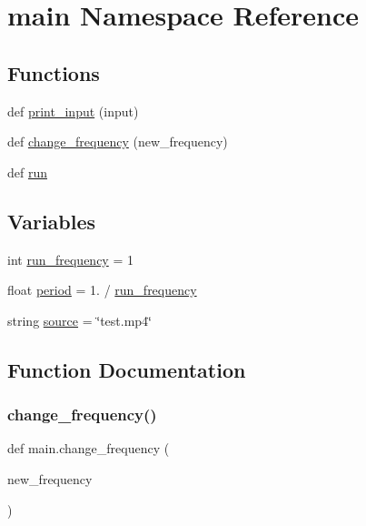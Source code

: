 \hypertarget{namespacemain}{}\section{main Namespace Reference}
\label{namespacemain}
\subsection*{Functions}
\begin{DoxyCompactItemize}
\item 
def \hyperlink{namespacemain_a0fe3fdb168f80f23bd787b6a6645d063}{print\+\_\+input} (input)
\item 
def \hyperlink{namespacemain_a191dcce5a995145c51a8935645d7de97}{change\+\_\+frequency} (new\+\_\+frequency)
\item 
def \hyperlink{namespacemain_a1fa92828a6a055fa38390012ffdd2b87}{run}
\end{DoxyCompactItemize}
\subsection*{Variables}
\begin{DoxyCompactItemize}
\item 
int \hyperlink{namespacemain_a57172d55d7c1b86fc48bcbc6c3783efb}{run\+\_\+frequency} = 1
\item 
float \hyperlink{namespacemain_a9ec7279618de6ff9195552f460584339}{period} = 1. / \hyperlink{namespacemain_a57172d55d7c1b86fc48bcbc6c3783efb}{run\+\_\+frequency}
\item 
string \hyperlink{namespacemain_a75667a1170a74674aa6f7fa04dca3f51}{source} = \char`\"{}test.\+mp4\char`\"{}
\end{DoxyCompactItemize}


\subsection{Function Documentation}
\mbox{\label{namespacemain_a191dcce5a995145c51a8935645d7de97}} 
\subsubsection{\texorpdfstring{change\+\_\+frequency()}{change\_frequency()}}
{\footnotesize\ttfamily def main.\+change\+\_\+frequency (\begin{DoxyParamCaption}\item[{}]{new\+\_\+frequency }\end{DoxyParamCaption})}

